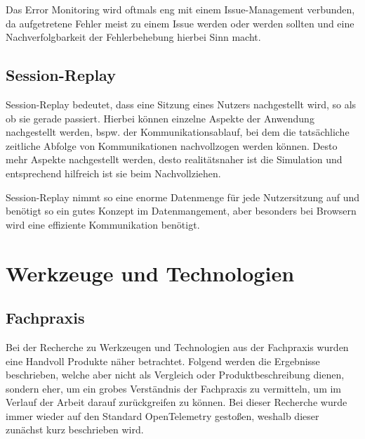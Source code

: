 Das Error Monitoring wird oftmals eng mit einem Issue-Management verbunden, da aufgetretene Fehler meist zu einem Issue werden oder werden sollten und eine Nachverfolgbarkeit der Fehlerbehebung hierbei Sinn macht.

\subsection{Session-Replay}

Session-Replay bedeutet, dass eine Sitzung eines Nutzers nachgestellt wird, so als ob sie gerade passiert. Hierbei können einzelne Aspekte der Anwendung nachgestellt werden, bspw. der Kommunikationsablauf, bei dem die tatsächliche zeitliche Abfolge von Kommunikationen nachvollzogen werden können. Desto mehr Aspekte nachgestellt werden, desto realitätsnaher ist die Simulation und entsprechend hilfreich ist sie beim Nachvollziehen.

Session-Replay nimmt so eine enorme Datenmenge für jede Nutzersitzung auf und benötigt so ein gutes Konzept im Datenmangement, aber besonders bei Browsern wird eine effiziente Kommunikation benötigt.

\newpage

\section{Werkzeuge und Technologien}
\label{sec:werkzeuge-und-technologien}

%
%

\subsection{Fachpraxis}

Bei der Recherche zu Werkzeugen und Technologien aus der Fachpraxis wurden eine Handvoll Produkte näher betrachtet. Folgend werden die Ergebnisse beschrieben, welche aber nicht als Vergleich oder Produktbeschreibung dienen, sondern eher, um ein grobes Verständnis der Fachpraxis zu vermitteln, um im Verlauf der Arbeit darauf zurückgreifen zu können. Bei dieser Recherche wurde immer wieder auf den Standard OpenTelemetry gestoßen, weshalb dieser zunächst kurz beschrieben wird.

